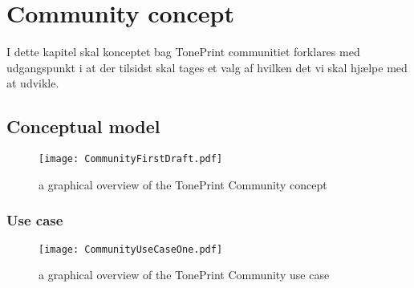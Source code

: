 \chapter{Community concept}
\label{CommunityConcept}
I dette kapitel skal konceptet bag TonePrint communitiet forklares med udgangspunkt i at der tilsidst skal tages et valg af hvilken det vi skal hjælpe med at udvikle.\\

\section{Conceptual model}
\label{ConceptualModel}

\begin{figure}[H]
	\centering
	\texttt{[image: CommunityFirstDraft.pdf]}
	\caption{a graphical overview of the TonePrint Community concept}
	\label{fig:CommunityConceptualModel}
\end{figure}

\subsection{Use case}

\begin{figure}[H]
	\centering
	\texttt{[image: CommunityUseCaseOne.pdf]}
	\caption{a graphical overview of the TonePrint Community use case}
	\label{fig:CommunityConceptualUseCase}
\end{figure}